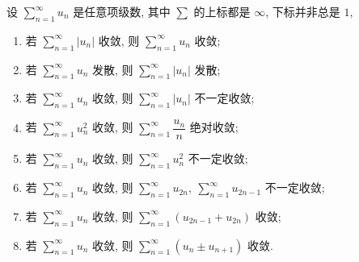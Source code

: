 \begin{theorem}
    设 $\displaystyle\sum_{n=1}^{\infty}u_n$ 是任意项级数, 其中 $\sum$ 的上标都是 $\infty$, 下标并非总是 $1$, 
    \begin{enumerate}[label=(\arabic{*})]
        \item 若 $\displaystyle \sum_{n=1}^{\infty}|u_n|$ 收敛, 则 $\displaystyle\sum_{n=1}^{\infty}u_n$ 收敛; 
        \item 若 $\displaystyle\sum_{n=1}^{\infty}u_n$ 发散, 则 $\displaystyle\sum_{n=1}^{\infty}|u_n|$ 发散;
        \item 若 $\displaystyle\sum_{n=1}^{\infty}u_n$ 收敛, 则 $\displaystyle\sum_{n=1}^{\infty}|u_n|$ 不一定收敛;
        \item 若 $\displaystyle\sum_{n=1}^{\infty}u^2_n$ 收敛, 则 $\displaystyle\sum_{n=1}^{\infty}\dfrac{u_n}{n}$ 绝对收敛;
        \item 若 $\displaystyle\sum_{n=1}^{\infty}u_n$ 收敛, 则 $\displaystyle\sum_{n=1}^{\infty}u^2_n$ 不一定收敛;
        \item 若 $\displaystyle\sum_{n=1}^{\infty}u_n$ 收敛, 则 $\displaystyle\sum_{n=1}^{\infty}u_{2n},~\displaystyle\sum_{n=1}^{\infty}u_{2n-1}$ 不一定收敛;
        \item 若 $\displaystyle\sum_{n=1}^{\infty}u_n$ 收敛, 则 $\displaystyle\sum_{n=1}^{\infty}(u_{2n-1}+u_{2n})$ 收敛;
        \item 若 $\displaystyle\sum_{n=1}^{\infty}u_n$ 收敛, 则 $\displaystyle\sum_{n=1}^{\infty}(u_{n}\pm u_{n+1})$ 收敛.
    \end{enumerate}
\end{theorem}

